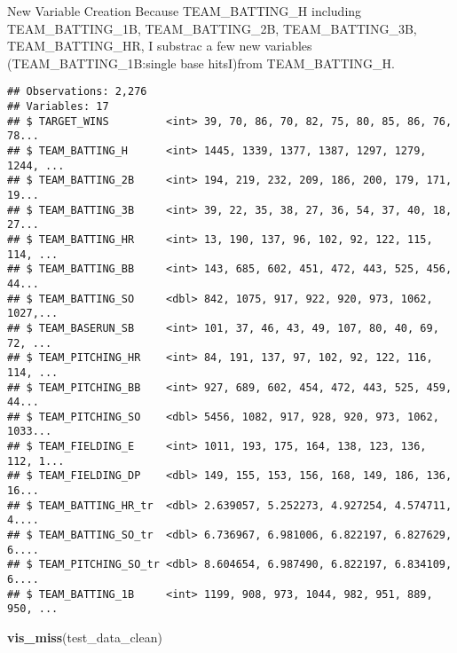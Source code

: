 \documentclass[]{article}
\newenvironment{Shaded}{\begin{snugshade}}{\end{snugshade}}
\newcommand{\KeywordTok}[1]{\textcolor[rgb]{0.13,0.29,0.53}{\textbf{#1}}}
\newcommand{\DataTypeTok}[1]{\textcolor[rgb]{0.13,0.29,0.53}{#1}}
\newcommand{\StringTok}[1]{\textcolor[rgb]{0.31,0.60,0.02}{#1}}
\newcommand{\OperatorTok}[1]{\textcolor[rgb]{0.81,0.36,0.00}{\textbf{#1}}}
\newcommand{\NormalTok}[1]{#1}
\begin{document}
New Variable Creation Because TEAM\_BATTING\_H including
TEAM\_BATTING\_1B, TEAM\_BATTING\_2B, TEAM\_BATTING\_3B,
TEAM\_BATTING\_HR, I substrac a few new variables
(TEAM\_BATTING\_1B:single base hitsI)from TEAM\_BATTING\_H.

\begin{Shaded}
\end{Shaded}

\begin{verbatim}
## Observations: 2,276
## Variables: 17
## $ TARGET_WINS         <int> 39, 70, 86, 70, 82, 75, 80, 85, 86, 76, 78...
## $ TEAM_BATTING_H      <int> 1445, 1339, 1377, 1387, 1297, 1279, 1244, ...
## $ TEAM_BATTING_2B     <int> 194, 219, 232, 209, 186, 200, 179, 171, 19...
## $ TEAM_BATTING_3B     <int> 39, 22, 35, 38, 27, 36, 54, 37, 40, 18, 27...
## $ TEAM_BATTING_HR     <int> 13, 190, 137, 96, 102, 92, 122, 115, 114, ...
## $ TEAM_BATTING_BB     <int> 143, 685, 602, 451, 472, 443, 525, 456, 44...
## $ TEAM_BATTING_SO     <dbl> 842, 1075, 917, 922, 920, 973, 1062, 1027,...
## $ TEAM_BASERUN_SB     <int> 101, 37, 46, 43, 49, 107, 80, 40, 69, 72, ...
## $ TEAM_PITCHING_HR    <int> 84, 191, 137, 97, 102, 92, 122, 116, 114, ...
## $ TEAM_PITCHING_BB    <int> 927, 689, 602, 454, 472, 443, 525, 459, 44...
## $ TEAM_PITCHING_SO    <dbl> 5456, 1082, 917, 928, 920, 973, 1062, 1033...
## $ TEAM_FIELDING_E     <int> 1011, 193, 175, 164, 138, 123, 136, 112, 1...
## $ TEAM_FIELDING_DP    <dbl> 149, 155, 153, 156, 168, 149, 186, 136, 16...
## $ TEAM_BATTING_HR_tr  <dbl> 2.639057, 5.252273, 4.927254, 4.574711, 4....
## $ TEAM_BATTING_SO_tr  <dbl> 6.736967, 6.981006, 6.822197, 6.827629, 6....
## $ TEAM_PITCHING_SO_tr <dbl> 8.604654, 6.987490, 6.822197, 6.834109, 6....
## $ TEAM_BATTING_1B     <int> 1199, 908, 973, 1044, 982, 951, 889, 950, ...
\end{verbatim}

\begin{Shaded}
\begin{Highlighting}[]
\KeywordTok{vis_miss}\NormalTok{(test_data_clean)}
\end{Highlighting}
\end{Shaded}
\end{document}
